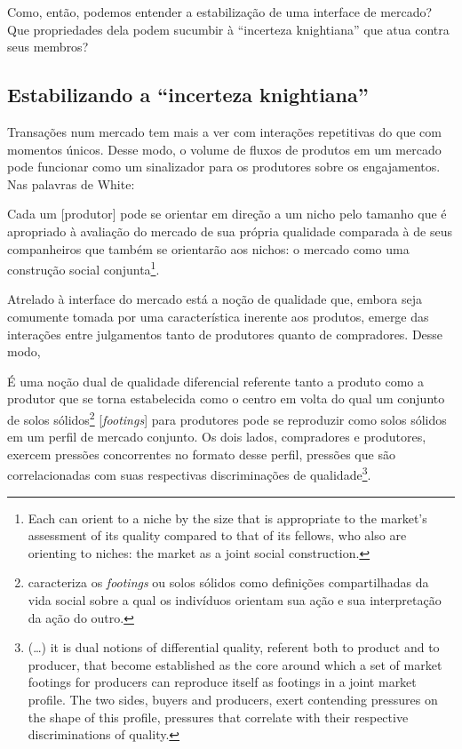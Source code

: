 \documentclass[a4paper, 12pt, openright, oneside, german, french, english, brazil]{abntex2}
\begin{document}
	Como, então, podemos entender a estabilização de uma interface de mercado? Que propriedades dela podem sucumbir à ``incerteza knightiana'' que atua contra seus membros?

	\subsection{Estabilizando a ``incerteza knightiana''}

	Transações num mercado tem mais a ver com interações repetitivas do que com momentos únicos. Desse modo, o volume de fluxos de produtos em um mercado pode funcionar como um sinalizador para os produtores sobre os engajamentos. Nas palavras de White:

	\begin{citacao}
		Cada um [produtor] pode se orientar em direção a um nicho pelo tamanho que é apropriado à avaliação do mercado de sua própria qualidade comparada à de seus companheiros que também se orientarão aos nichos: o mercado como uma construção social conjunta\footnote{Each can orient to a niche by the size that is appropriate to the market's assessment of its quality compared to that of its fellows, who also are orienting to niches: the market as a joint social construction.}. \cite[p. 10]{white2002markets}
	\end{citacao}

	Atrelado à interface do mercado está a noção de qualidade que, embora seja comumente tomada por uma característica inerente aos produtos, emerge das interações entre julgamentos tanto de produtores quanto de compradores. Desse modo,

	\begin{citacao}
		É uma noção dual de qualidade diferencial referente tanto a produto como a produtor que se torna estabelecida como o centro em volta do qual um conjunto de solos sólidos\footnote{ caracteriza os \textit{footings} ou solos sólidos como definições compartilhadas da vida social sobre a qual os indivíduos orientam sua ação e sua interpretação da ação do outro.} [\textit{footings}] para produtores pode se reproduzir como solos sólidos em um perfil de mercado conjunto. Os dois lados, compradores e produtores, exercem pressões concorrentes no formato desse perfil, pressões que são correlacionadas com suas respectivas discriminações de qualidade\footnote{(\dots) it is dual notions of differential quality, referent both to product and to producer, that become established as the core around which a set of market footings for producers can reproduce itself as footings in a joint market profile. The two sides, buyers and producers, exert contending pressures on the shape of this profile, pressures that correlate with their respective discriminations of quality.}. \cite[p. 10]{white2002markets}
	\end{citacao}
\end{document}
